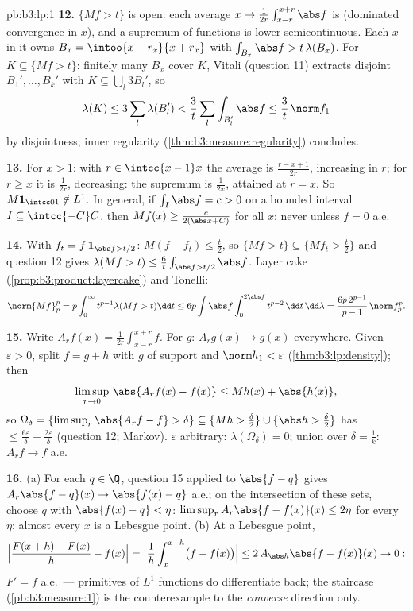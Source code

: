\begin{solution}{pb:b3:lp:1}
\textbf{12.} $\{Mf > t\}$ is open: each average $x \mapsto
\frac1{2r}\int_{x-r}^{x+r}\abs f$ is  (dominated
convergence in $x$), and a supremum of  functions
is lower semicontinuous. Each $x$ in it owns $B_x =
\intoo{x-r_x}{x+r_x}$ with $\int_{B_x}\abs f >
t\,\lambda(B_x)$. For  $K \subseteq \{Mf > t\}$:
finitely many $B_x$ cover $K$, Vitali (question 11) extracts
disjoint $B_1', \dots, B_k'$ with $K \subseteq
\bigcup_l3B_l'$, so
\[
\lambda(K) \leq 3\sum_l\lambda(B_l') <
\frac3t\sum_l\int_{B_l'}\abs f \leq \frac3t\,\norm f_1
\]
by disjointness; inner regularity
(\cref{thm:b3:measure:regularity}) concludes.

\textbf{13.} For $x > 1$: with $r \in \intcc{x-1}x$ the
average is $\frac{r - x + 1}{2r}$, increasing in $r$; for $r
\geq x$ it is $\frac1{2r}$, decreasing: the supremum is
$\frac1{2x}$, attained at $r = x$. So $M\mathbf 1_{\intcc01}
\notin L^1$. In general, if $\int_I\abs f = c > 0$ on a
bounded interval $I \subseteq \intcc{-C}C$, then $Mf(x) \geq
\frac{c}{2(\abs x + C)}$ for all $x$: never 
unless $f = 0$ a.e.

\textbf{14.} With $f_t = f\,\mathbf 1_{\abs f > t/2}$:
$M(f - f_t) \leq \frac t2$, so $\{Mf > t\} \subseteq \{Mf_t
> \frac t2\}$ and question 12 gives $\lambda(Mf > t) \leq
\frac6t\int_{\abs f > t/2}\abs f$. Layer cake
(\cref{prop:b3:product:layercake}) and Tonelli:
\[
\norm{Mf}_p^p = p\int_0^\infty t^{p-1}\lambda(Mf > t)\dd t
\leq 6p\int\abs f\int_0^{2\abs f}t^{p-2}\,\dd t\,\dd\lambda
= \frac{6p\,2^{p-1}}{p-1}\,\norm f_p^p .
\]

\textbf{15.} Write $A_rf(x) = \frac1{2r}\int_{x-r}^{x+r}f$.
For  $g$: $A_rg(x) \to g(x)$ everywhere. Given
$\varepsilon > 0$, split $f = g + h$ with $g$  of
 support and $\norm h_1 < \varepsilon$
(\cref{thm:b3:lp:density}); then
\[
\limsup_{r\to0}\,\abs{A_rf(x) - f(x)} \leq Mh(x) +
\abs{h(x)},
\]
so $\Omega_\delta = \{\limsup_r\abs{A_rf - f} > \delta\}
\subseteq \{Mh > \tfrac\delta2\} \cup \{\abs h >
\tfrac\delta2\}$ has  $\leq \frac{6\varepsilon}\delta
+ \frac{2\varepsilon}\delta$ (question 12; Markov).
$\varepsilon$ arbitrary: $\lambda(\Omega_\delta) = 0$; union
over $\delta = \frac1k$: $A_rf \to f$ a.e.

\textbf{16.} (a) For each $q \in \Q$, question 15 applied to
$\abs{f - q}$ gives $A_r\abs{f - q}(x) \to \abs{f(x) - q}$
a.e.; on the intersection of these  sets, choose
$q$ with $\abs{f(x) - q} < \eta$:
$\limsup_rA_r\abs{f - f(x)}(x) \leq 2\eta$ for every $\eta$:
almost every $x$ is a Lebesgue point. (b) At a Lebesgue
point,
\[
\Bigl|\frac{F(x + h) - F(x)}h - f(x)\Bigr|
= \Bigl|\frac1h\int_x^{x+h}\bigl(f - f(x)\bigr)\Bigr|
\leq 2\,A_{\abs h}\abs{f - f(x)}(x) \to 0 :
\]
$F' = f$ a.e.\ --- primitives of $L^1$ functions do
differentiate back; the staircase (\cref{pb:b3:measure:1})
is the counterexample to the \emph{converse} direction only.


\end{solution}
